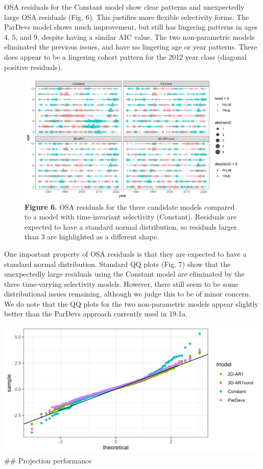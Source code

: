 \documentclass[
]{article}
\begin{document}
OSA residuals for the Constant model show clear patterns and
unexpectedly large OSA residuals (Fig. 6). This justifies more flexible
selectivity forms. The ParDevs model shows much improvement, but still
has lingering patterns in ages 4, 5, and 9, despite having a similar AIC
value. The two non-parametric models eliminated the previous issues, and
have no lingering age or year patterns. There does appear to be a
lingering cohort pattern for the 2012 year class (diagonal positive
residuals).

\begin{figure}
\hypertarget{fig:figure6}{%
\centering
\includegraphics{Results/Figure6_osa_tmb.png}
\caption{\textbf{Figure 6.} OSA residuals for the three candidate models
compared to a model with time-invariant selectivity (Constant).
Residuals are expected to have a standard normal distribution, so
residuals larger than 3 are highlighted as a different
shape.}\label{fig:figure6}
}
\end{figure}

One important property of OSA residuals is that they are expected to
have a standard normal distribution. Standard QQ plots (Fig. 7) show
that the unexpectedly large residuals using the Constant model are
eliminated by the three time-varying selectivity models. However, there
still seem to be some distributional issues remaining, although we judge
this to be of minor concern. We do note that the QQ plots for the two
non-parametric models appear slightly better than the ParDevs approach
currently used in 19.1a.

\includegraphics{Results/Figure7_qqplot.png} \#\# Projection performance
\end{document}
